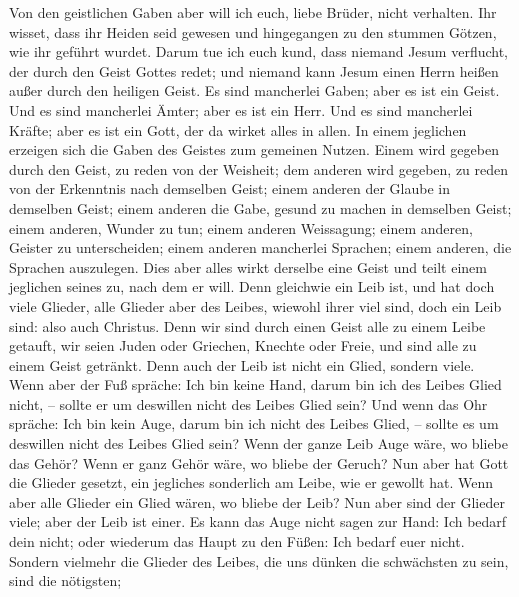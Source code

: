  Von den geistlichen Gaben aber will ich euch, liebe
Brüder, nicht verhalten.  Ihr wisset, dass ihr Heiden seid
gewesen und hingegangen zu den stummen Götzen, wie ihr geführt wurdet.
 Darum tue ich euch kund, dass niemand Jesum verflucht,
der durch den Geist Gottes redet; und niemand kann Jesum einen Herrn
heißen außer durch den heiligen Geist.  Es sind mancherlei
Gaben; aber es ist ein Geist.  Und es sind mancherlei
Ämter; aber es ist ein Herr.  Und es sind mancherlei
Kräfte; aber es ist ein Gott, der da wirket alles in allen.
 In einem jeglichen erzeigen sich die Gaben des Geistes
zum gemeinen Nutzen.  Einem wird gegeben durch den Geist,
zu reden von der Weisheit; dem anderen wird gegeben, zu reden von der
Erkenntnis nach demselben Geist;  einem anderen der Glaube
in demselben Geist; einem anderen die Gabe, gesund zu machen in
demselben Geist;  einem anderen, Wunder zu tun; einem
anderen Weissagung; einem anderen, Geister zu unterscheiden; einem
anderen mancherlei Sprachen; einem anderen, die Sprachen auszulegen.
 Dies aber alles wirkt derselbe eine Geist und teilt
einem jeglichen seines zu, nach dem er will.  Denn
gleichwie ein Leib ist, und hat doch viele Glieder, alle Glieder aber
des Leibes, wiewohl ihrer viel sind, doch ein Leib sind: also auch
Christus.  Denn wir sind durch einen Geist alle zu einem
Leibe getauft, wir seien Juden oder Griechen, Knechte oder Freie, und
sind alle zu einem Geist getränkt.  Denn auch der Leib
ist nicht ein Glied, sondern viele.  Wenn aber der Fuß
spräche: Ich bin keine Hand, darum bin ich des Leibes Glied nicht, --
sollte er um deswillen nicht des Leibes Glied sein?  Und
wenn das Ohr spräche: Ich bin kein Auge, darum bin ich nicht des Leibes
Glied, -- sollte es um deswillen nicht des Leibes Glied sein?
 Wenn der ganze Leib Auge wäre, wo bliebe das Gehör? Wenn
er ganz Gehör wäre, wo bliebe der Geruch?  Nun aber hat
Gott die Glieder gesetzt, ein jegliches sonderlich am Leibe, wie er
gewollt hat.  Wenn aber alle Glieder ein Glied wären, wo
bliebe der Leib?  Nun aber sind der Glieder viele; aber
der Leib ist einer.  Es kann das Auge nicht sagen zur
Hand: Ich bedarf dein nicht; oder wiederum das Haupt zu den Füßen: Ich
bedarf euer nicht.  Sondern vielmehr die Glieder des
Leibes, die uns dünken die schwächsten zu sein, sind die nötigsten;
